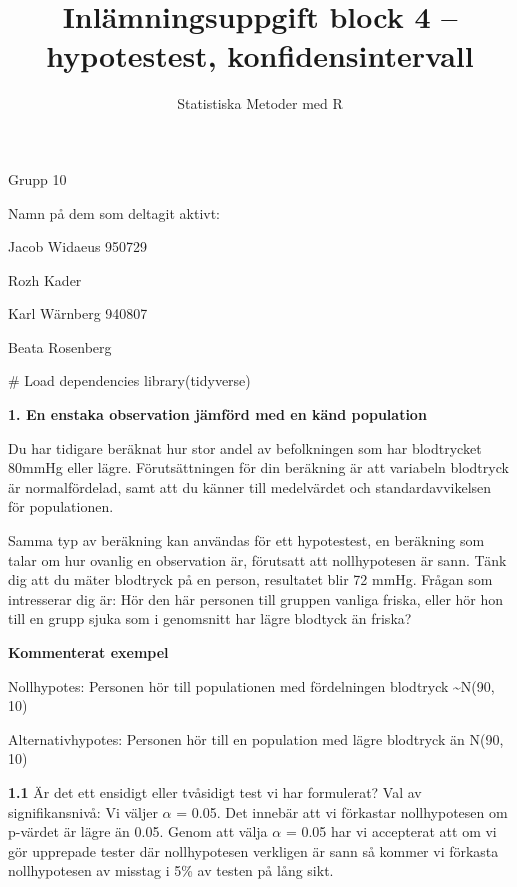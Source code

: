 \documentclass[
  letterpaper,
  DIV=11,
  numbers=noendperiod]{scrartcl}
\title{Inlämningsuppgift block 4 -- hypotestest, konfidensintervall}
\author{Statistiska Metoder med R}
\date{}
\newenvironment{Shaded}{\begin{snugshade}}{\end{snugshade}}
\newcommand{\CommentTok}[1]{\textcolor[rgb]{0.37,0.37,0.37}{#1}}
\newcommand{\FunctionTok}[1]{\textcolor[rgb]{0.28,0.35,0.67}{#1}}
\newcommand{\NormalTok}[1]{\textcolor[rgb]{0.00,0.23,0.31}{#1}}
\begin{document}
\maketitle


Grupp 10

Namn på dem som deltagit aktivt:

Jacob Widaeus 950729

Rozh Kader

Karl Wärnberg 940807

Beata Rosenberg

\hfill\break

\hfill\break

\begin{Shaded}
\begin{Highlighting}[]
\CommentTok{\# Load dependencies}
\FunctionTok{library}\NormalTok{(tidyverse)}
\end{Highlighting}
\end{Shaded}

\textbf{1. En enstaka observation jämförd med en känd population}

Du har tidigare beräknat hur stor andel av befolkningen som har
blodtrycket 80mmHg eller lägre. Förutsättningen för din beräkning är att
variabeln blodtryck är normalfördelad, samt att du känner till
medelvärdet och standardavvikelsen för populationen.

Samma typ av beräkning kan användas för ett hypotestest, en beräkning
som talar om hur ovanlig en observation är, förutsatt att nollhypotesen
är sann. Tänk dig att du mäter blodtryck på en person, resultatet blir
72 mmHg. Frågan som intresserar dig är: Hör den här personen till
gruppen vanliga friska, eller hör hon till en grupp sjuka som i
genomsnitt har lägre blodtyck än friska?

\textbf{Kommenterat exempel}

Nollhypotes: Personen hör till populationen med fördelningen blodtryck
\textasciitilde N(90, 10)

Alternativhypotes: Personen hör till en population med lägre blodtryck
än N(90, 10)

\textbf{1.1} Är det ett ensidigt eller tvåsidigt test vi har formulerat?
Val av signifikansnivå: Vi väljer \(α\) = 0.05. Det innebär att vi
förkastar nollhypotesen om p-värdet är lägre än 0.05. Genom att välja
\(α\) = 0.05 har vi accepterat att om vi gör upprepade tester där
nollhypotesen verkligen är sann så kommer vi förkasta nollhypotesen av
misstag i 5\% av testen på lång sikt.
\end{document}
